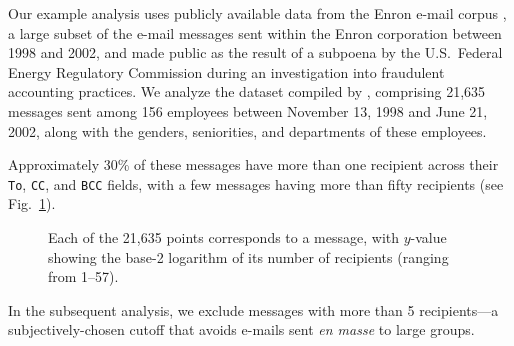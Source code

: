 \documentclass[final]{statsoc}
\begin{document}
\newcommand{\refTemployeesummary}{1} %
Our example analysis uses publicly available data from the Enron e-mail
corpus \citep{cohen2009enron}, a large subset of the e-mail messages sent
within the Enron corporation between 1998 and 2002, and made
public as the result of a subpoena by the U.S.~Federal Energy Regulatory
Commission during an investigation into fraudulent accounting practices.
We analyze the dataset compiled by \citet{zhou2007strategies}, comprising
21,635 messages sent among 156 employees between November 13, 1998 and
June 21, 2002, along with the genders, seniorities, and departments of
these employees.

Approximately 30\% of these messages have more than one recipient across
their \texttt{To}, \texttt{CC}, and \texttt{BCC} fields, with a few
messages having more than fifty recipients
(see Fig.~\ref{F:recipient-counts}).
\begin{figure}
    \centering
    \caption{
        Each of the 21,635 points corresponds to a message, with
        $y$-value showing the base-2 logarithm of its number of recipients
        (ranging from 1--57).
    }\label{F:recipient-counts}
\end{figure}
In the subsequent analysis, we exclude messages with more than 5
recipients---a subjectively-chosen cutoff that avoids e-mails sent
\emph{en masse} to large groups.
\end{document}
